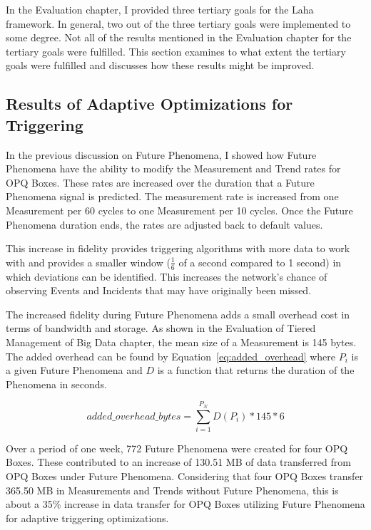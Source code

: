 In the Evaluation chapter, I provided three tertiary goals for the Laha framework. In general, two out of the three tertiary goals were implemented to some degree. Not all of the results mentioned in the Evaluation chapter for the tertiary goals were fulfilled. This section examines to what extent the tertiary goals were fulfilled and discusses how these results might be improved.

\subsection{Results of Adaptive Optimizations for Triggering}\label{subsec:results-of-adaptive-optimizations-for-triggering}

In the previous discussion on Future Phenomena, I showed how Future Phenomena have the ability to modify the Measurement and Trend rates for OPQ Boxes. These rates are increased over the duration that a Future Phenomena signal is predicted. The measurement rate is increased from one Measurement per 60 cycles to one Measurement per 10 cycles. Once the Future Phenomena duration ends, the rates are adjusted back to default values.

This increase in fidelity provides triggering algorithms with more data to work with and provides a smaller window ($\frac{1}{6}$ of a second compared to 1 second) in which deviations can be identified. This increases the network's chance of observing Events and Incidents that may have originally been missed.

The increased fidelity during Future Phenomena adds a small overhead cost in terms of bandwidth and storage. As shown in the Evaluation of Tiered Management of Big Data chapter, the mean size of a Measurement is 145 bytes. The added overhead can be found by Equation~\ref{eq:added_overhead} where $P_i$ is a given Future Phenomena and $D$ is a function that returns the duration of the Phenomena in seconds.

\begin{equation}
    added\_overhead\_bytes = \sum_{i=1}^{P_{N}} D(P_i) * 145 * 6
    \label{eq:added_overhead}
\end{equation}

Over a period of one week, 772 Future Phenomena were created for four OPQ Boxes. These contributed to an increase of 130.51 MB of data transferred from OPQ Boxes under Future Phenomena. Considering that four OPQ Boxes transfer 365.50 MB in Measurements and Trends without Future Phenomena, this is about a 35\% increase in data transfer for OPQ Boxes utilizing Future Phenomena for adaptive triggering optimizations.

